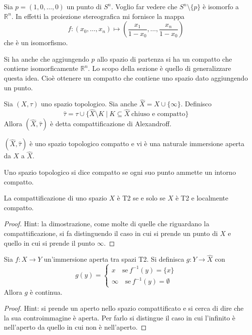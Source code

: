 \begin{ex}
    Sia $p=(1,0,\dots,0)$ un punto di $S^n$. Voglio far vedere che $S^n\setminus\{p\}$ \`e isomorfo a $\mathbb{R}^n$. In effetti la proiezione stereografica mi fornisce la mappa
    \[
        f\colon(x_0, \dots, x_n)\mapsto(\frac{x_1}{1-x_0}, \dots, \frac{x_n}{1-x_0})
    \]
    che \`e un isomorfismo.

    Si ha anche che aggiungendo $p$ allo spazio di partenza si ha un compatto che contiene isomorficamente $\mathbb{R}^n$. Lo scopo della sezione \`e quello di generalizzare questa idea. Cio\`e ottenere un compatto che contiene uno spazio dato aggiungendo un punto.
\end{ex}

\begin{defn}
    Sia $(X,\tau)$ uno spazio topologico. Sia anche $\hat{X} = X \cup \{\infty\}$. Definisco
    \[
        \hat{\tau} = \tau \cup \{\hat{X}\setminus K\; |\ K \subseteq \hat{X}\  \text{chiuso e compatto}\}
    \]
    Allora $(\hat{X}, \hat{\tau})$ \`e detta compattificazione di Alexandroff.
\end{defn}

\begin{oss}
    $(\hat{X}, \hat{\tau})$ \`e uno spazio topologico compatto e vi \`e una naturale immersione aperta da $X$ a $\hat{X}$.
\end{oss}

\begin{defn}
    Uno spazio topologico si dice compatto se ogni suo punto ammette un intorno compatto.
\end{defn}

\begin{prop}
    La compattificazione di uno spazio $X$ \`e T2 se e solo se $X$ \`e T2 e localmente compatto.
\end{prop}
\begin{proof}
    Hint: la dimostrazione, come molte di quelle che riguardano la compattificazione, si fa distinguendo il caso in cui si prende un punto di $X$ e quello in cui si prende il punto $\infty$.
\end{proof}

\begin{prop}
    Sia $f\colon X \longrightarrow Y$ un'immersione aperta tra spazi T2. Si definisca $g\colon Y \longrightarrow \hat{X}$ con
    \[
        g(y) =
        \begin{cases}
            x\quad \text{se}\ f^{-1}(y) = \{x\}\\
            \infty \quad\text{se}\ f^{-1}(y) = \emptyset
        \end{cases}
    \]
    Allora $g$ \`e continua.
\end{prop}
\begin{proof}
    Hint: si prende un aperto nello spazio compattificato e si cerca di dire che la sua controimmagine \`e aperta. Per farlo si distingue il caso in cui l'infinito \`e nell'aperto da quello in cui non \`e nell'aperto.
\end{proof}

